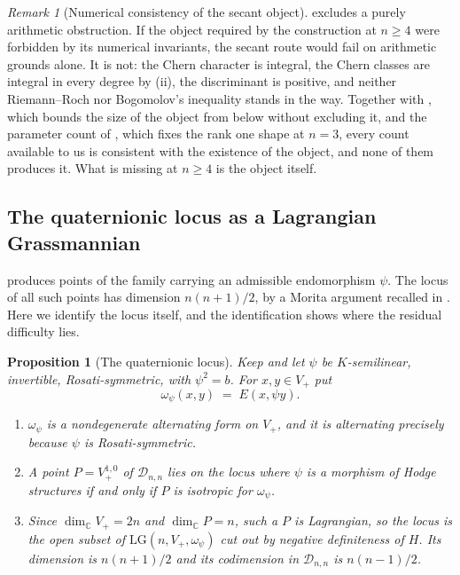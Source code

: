 \documentclass[11pt,reqno]{amsart}
\theoremstyle{plain}
\newtheorem{proposition}[theorem]{Proposition}
\theoremstyle{definition}
\theoremstyle{remark}
\newtheorem{remark}[theorem]{Remark}
\newcommand{\CC}{\mathbb{C}}
\newcommand{\cD}{\mathcal{D}}
\begin{document}
\begin{remark}[Numerical consistency of the secant object]%
\label{rem:notforbidden}
 excludes a purely arithmetic obstruction. If the
object required by the construction at $n\ge4$ were forbidden by its
numerical invariants, the secant route would fail on arithmetic grounds
alone. It is not: the Chern character is integral, the Chern classes are
integral in every degree by (ii), the
discriminant is positive, and neither Riemann--Roch nor Bogomolov's
inequality stands in the way.
Together with , which bounds the size of the object from
below without excluding it, and the parameter count of ,
which fixes the rank one shape at $n=3$, every count available to us is
consistent with the existence of the object, and none of them produces it.
What is missing at $n\ge4$ is the object itself.
\end{remark}

\subsection{The quaternionic locus as a Lagrangian Grassmannian}
\label{ssec:lagrangian}

 produces points of the family carrying an admissible
endomorphism $\psi$. The locus of all such points has dimension $n(n+1)/2$,
by a Morita argument recalled in . Here we identify the locus
itself, and the identification shows where the residual difficulty lies.

\begin{proposition}[The quaternionic locus]\label{prop:lagrangian}
Keep  and let $\psi$ be $K$-semilinear, invertible,
Rosati-symmetric, with $\psi^{2}=b$. For $x,y\in V_{+}$ put
\[
  \omega_{\psi}(x,y)\;=\;E(x,\psi y).
\]
\begin{enumerate}[label=\textup{(\roman*)},nosep]
\item $\omega_{\psi}$ is a nondegenerate alternating form on $V_{+}$, and it
  is alternating precisely because $\psi$ is Rosati-symmetric.
\item A point $P=V_{+}^{1,0}$ of $\cD_{n,n}$ lies on the locus where $\psi$
  is a morphism of Hodge structures if and only if $P$ is isotropic for
  $\omega_{\psi}$.
\item Since $\dim_{\CC}V_{+}=2n$ and $\dim_{\CC}P=n$, such a $P$ is
  Lagrangian, so the locus is the open subset of
  $\mathrm{LG}(n,V_{+},\omega_{\psi})$ cut out by negative definiteness of
  $H$. Its dimension is $n(n+1)/2$ and its codimension in $\cD_{n,n}$ is
  $n(n-1)/2$.
\end{enumerate}
\end{proposition}
\end{document}
